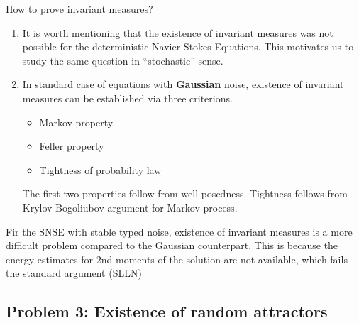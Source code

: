 \documentclass[xcolor=dvipsnames,leqno]{beamer}
\begin{document}
\begin{frame}{How to prove invariant measures?}
	\begin{enumerate}
		\item It is worth mentioning that the existence of invariant measures was not possible for the deterministic Navier-Stokes Equations. This motivates us to study the same question in ``stochastic'' sense.
		\item  In standard case of equations with \textbf{Gaussian} noise, existence of invariant measures can be established via three criterions.
		\begin{itemize}
			\item Markov property
			\item Feller property
			\item Tightness of probability law
		\end{itemize}
		The first two properties follow from well-posedness. Tightness follows from Krylov-Bogoliubov argument for Markov process.
	\end{enumerate}
Fir the SNSE with stable typed noise, existence of invariant measures is a more difficult problem compared to the Gaussian counterpart. This is because the energy estimates for 2nd moments of the solution are not available, which fails the standard argument (SLLN)
\end{frame}

\subsection{Problem 3: Existence of random attractors}
\end{document}
